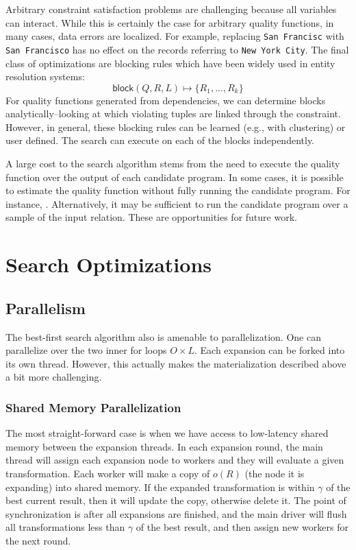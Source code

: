   Arbitrary constraint satisfaction problems are challenging because all variables can interact. While this is certainly the case for arbitrary quality functions, in many cases, data errors are localized. For example, replacing \texttt{San Francisc} with \texttt{San Francisco} has no effect on the records referring to \texttt{New York City}. The final class of optimizations are blocking rules which have been widely used in entity resolution systems:
\[\textsf{block}(Q, R, L) \mapsto \{R_1,...,R_k\} \]
For quality functions generated from dependencies, we can determine blocks analytically--looking at which violating tuples are linked through the constraint.
However, in general, these blocking rules can be learned (e.g., with clustering) or user defined.
The search can execute on each of the blocks independently.

  A large cost to the search algorithm stems from the need to execute the quality function over the output of each candidate program.  In some cases, it is possible to estimate the quality function without fully running the candidate program.  For instance, .  Alternatively, it may be sufficient to run the candidate program over a sample of the input relation.  These are opportunities for future work.

\section{Search Optimizations}
\subsection{Parallelism}
The best-first search algorithm also is amenable to parallelization. One can parallelize over the two inner for loops $O \times L$. Each expansion can be forked into its own thread. However, this actually makes the materialization described above a bit more challenging. 

\subsubsection{Shared Memory Parallelization}
The most straight-forward case is when we have access to low-latency shared memory between the expansion threads. In each expansion round, the main thread will assign each expansion node to workers and they will evaluate a given transformation. Each worker will make a copy of $o(R)$ (the node it is expanding) into shared memory. 
If the expanded transformation is within $\gamma$ of the best current result, then it will update the copy, otherwise delete it. The point of synchronization is after all expansions are finished, and the main driver will flush all transformations less than $\gamma$ of the best result, and then assign new workers for the next round. 


